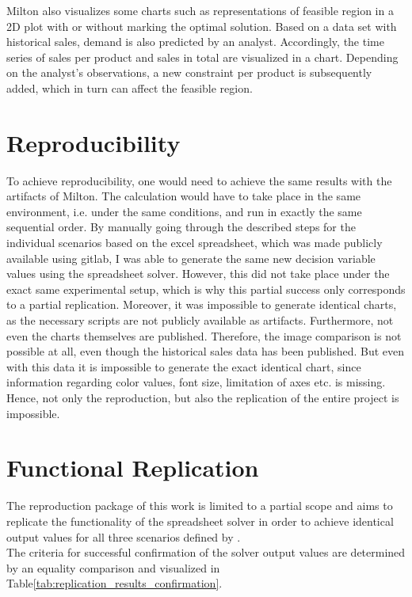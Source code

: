 \documentclass[sigconf, nonacm]{acmart}
\begin{document}
Milton\cite{Milton2009} also visualizes some charts such as representations of feasible region in a 2D plot with or without marking the optimal solution. Based on a data set with historical sales, demand is also predicted by an analyst. Accordingly, the time series of sales per product and sales in total are visualized in a chart. Depending on the analyst's observations, a new constraint per product is subsequently added, which in turn can affect the feasible region.

\section{Reproducibility}
To achieve reproducibility, one would need to achieve the same results with the artifacts of Milton\cite{Milton2009}. The calculation would have to take place in the same environment, i.e. under the same conditions, and run in exactly the same sequential order. By manually going through the described steps for the individual scenarios based on the excel spreadsheet, which was made publicly available using gitlab, I was able to generate the same new decision variable values using the spreadsheet solver. However, this did not take place under the exact same experimental setup, which is why this partial success only corresponds to a partial replication. Moreover, it was impossible to generate identical charts, as the necessary scripts are not publicly available as artifacts. Furthermore, not even the charts themselves are published. Therefore, the image comparison is not possible at all, even though the historical sales data has been published. But even with this data it is impossible to generate the exact identical chart, since information regarding color values, font size, limitation of axes etc. is missing. Hence, not only the reproduction, but also the replication of the entire project is impossible.

\section{Functional Replication}
The reproduction package of this work is limited to a partial scope and aims to replicate the functionality of the spreadsheet solver in order to achieve identical output values for all three scenarios defined by \cite{Milton2009}.\\
The criteria for successful confirmation of the solver output values are determined by an equality comparison and visualized in Table\ref{tab:replication_results_confirmation}.
\end{document}
